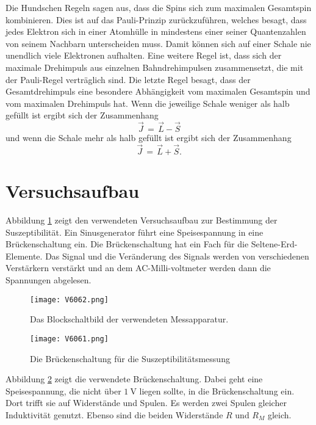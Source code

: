 \documentclass[
  bibliography=totoc,     %
  captions=tableheading,  %
  titlepage=firstiscover, %
]{scrartcl}
\begin{document}
\noindent
Die Hundschen Regeln sagen aus, dass die Spins sich zum maximalen
Gesamtspin kombinieren. Dies ist auf das Pauli-Prinzip zurückzuführen,
welches besagt, dass jedes Elektron sich in einer Atomhülle in mindestens
einer seiner Quantenzahlen von seinem Nachbarn unterscheiden muss. Damit
können sich auf einer Schale nie unendlich viele Elektronen aufhalten.
Eine weitere Regel ist, dass sich der maximale Drehimpuls aus einzelnen
Bahndrehimpulsen zusammensetzt, die mit der Pauli-Regel verträglich sind.
Die letzte Regel besagt, dass der Gesamtdrehimpuls eine besondere Abhängigkeit
vom maximalen Gesamtspin und vom maximalen Drehimpuls hat. Wenn die jeweilige
Schale weniger als halb gefüllt ist ergibt sich der Zusammenhang
\begin{equation*}
  \vec{J}\,=\,\vec{L}-\vec{S}
  \label{eqn:-}
\end{equation*}
und wenn die Schale mehr als halb gefüllt ist ergibt sich der Zusammenhang
\begin{equation}
  \vec{J}\,=\,\vec{L}+\vec{S}.
  \label{eqn:+}
\end{equation}
\clearpage
\section{Versuchsaufbau}
\label{sec:aufbau}
Abbildung \ref{fig:V6062} zeigt den verwendeten Versuchsaufbau zur Bestimmung
der Suszeptibilität. Ein Sinusgenerator führt eine Speisespannung in eine
Brückenschaltung ein. Die Brückenschaltung hat ein Fach für die
Seltene-Erd-Elemente. Das Signal und die Veränderung des Signals
werden von verschiedenen Verstärkern verstärkt und an dem AC-Milli-voltmeter
werden dann die Spannungen abgelesen.
\begin{figure}[H]
  \centering
  \texttt{[image: V6062.png]}
  \caption{Das Blockschaltbild der verwendeten Messapparatur. \cite{anleitung}}
  \label{fig:V6062}
\end{figure}
\noindent

\begin{figure}[H]
  \centering
  \texttt{[image: V6061.png]}
  \caption{Die Brückenschaltung für die Suszeptibilitätsmessung \cite{anleitung}}
  \label{fig:V6063}
\end{figure}
\noindent
Abbildung \ref{fig:V6063} zeigt die verwendete Brückenschaltung. Dabei geht
eine Speisespannung, die nicht über $\SI{1}{\volt}$ liegen sollte, in die
Brückenschaltung ein. Dort trifft sie auf Widerstände und Spulen. Es werden
zwei Spulen gleicher Induktivität genutzt. Ebenso sind die beiden Widerstände
$R$ und $R_M$ gleich.
\end{document}

